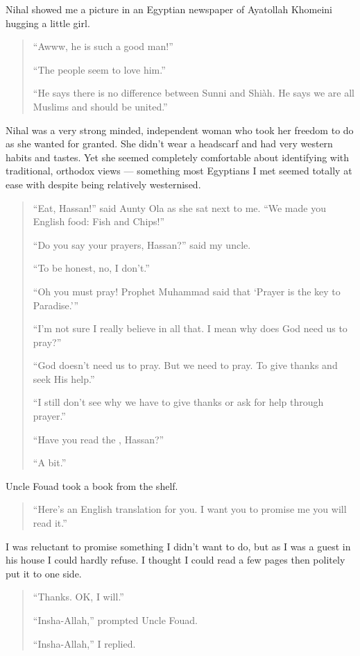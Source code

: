 \documentclass[12pt]{memoir}
\begin{document}
Nihal showed me a picture in an Egyptian newspaper
of Ayatollah Khomeini hugging a little girl.

\begin{quote}
“Awww, he is such a good man!”

“The people seem to love him.”

“He says there is no difference between Sunni and Shi\`ah.
He says we are all Muslims and should be united.”
\end{quote}

Nihal was a very strong minded,
independent woman who took her freedom to do as she wanted for granted.
She didn’t wear a headscarf and had very western habits and tastes.
Yet she seemed completely comfortable about identifying with traditional,
orthodox views — something most Egyptians I met
seemed totally at ease with despite being relatively westernised.

\begin{quote}
“Eat, Hassan!” said Aunty Ola as she sat next to me.
“We made you English food: Fish and Chips!”

“Do you say your prayers, Hassan?” said my uncle.

“To be honest, no, I don’t.”

“Oh you must pray!
Prophet Muhammad said that ‘Prayer is the key to Paradise.’”

“I’m not sure I really believe in all that.
I mean why does God need us to pray?”

“God doesn’t need us to pray.
But we need to pray.
To give thanks and seek His help.”

“I still don’t see why we have to give thanks or ask for help through prayer.”

“Have you read the \Quran, Hassan?”

“A bit.”
\end{quote}

Uncle Fouad took a book from the shelf.

\begin{quote}
“Here’s an English translation for you.
I want you to promise me you will read it.”
\end{quote}

I was reluctant to promise something I didn’t want to do,
but as I was a guest in his house I could hardly refuse.
I thought I could read a few pages then politely put it to one side.

\begin{quote}
“Thanks. OK, I will.”

“Insha-Allah,” prompted Uncle Fouad.

“Insha-Allah,” I replied.
\end{quote}
\end{document}
